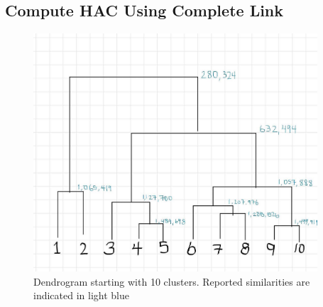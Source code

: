 \documentclass[letterpaper,10pt]{article}
\begin{document}
\subsection{Compute HAC Using Complete Link}
     \begin{figure}[ht]
    \centering
   \includegraphics[width=300pt]{Complete-Dendrogram.jpeg}
    \caption{Dendrogram starting with 10 clusters. Reported similarities are indicated in light blue}
    \label{fig:diffk}
    \end{figure}	
\end{document}
